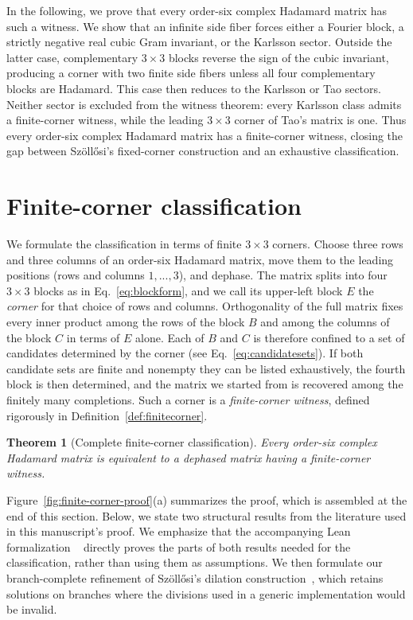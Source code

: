 \documentclass[aps,prx,reprint,nofootinbib,twoside,superscriptaddress,longbibliography,floatfix]{revtex4-2}
\newtheorem{theorem}{Theorem}
\theoremstyle{definition}
\begin{document}
In the following, we prove that every order-six complex Hadamard matrix has such a witness. We show that an infinite side fiber forces either a Fourier block, a strictly negative real cubic Gram invariant, or the Karlsson sector. Outside the latter case, complementary $3\times3$ blocks reverse the sign of the cubic invariant, producing a corner with two finite side fibers unless all four complementary blocks are Hadamard. This case then reduces to the Karlsson or Tao sectors. Neither sector is excluded from the witness theorem: every Karlsson class admits a finite-corner witness, while the leading $3\times3$ corner of Tao's matrix is one. Thus every order-six complex Hadamard matrix has a finite-corner witness, closing the gap between Sz\"oll\H{o}si's fixed-corner construction and an exhaustive classification.

\section{Finite-corner classification}
\label{sec:mainclassification}

We formulate the classification in terms of finite $3\times3$ corners.
Choose three rows and three columns of an order-six Hadamard matrix, move them to the leading positions (rows and columns $1,...,3$), and dephase. The matrix splits into four $3\times3$ blocks as in Eq.~\eqref{eq:blockform}, and we call its upper-left block $E$ the \emph{corner} for that choice of rows and columns. Orthogonality of the full matrix fixes every inner product among the rows of the block $B$ and among the columns of the block $C$ in terms of $E$ alone. Each of $B$ and $C$ is therefore confined to a set of candidates determined by the corner (see Eq.~\eqref{eq:candidatesets}).
If both candidate sets are finite and nonempty they can be listed exhaustively, the fourth block is then determined, and the matrix we started from is recovered among the finitely many completions. Such a corner is a \emph{finite-corner witness}, defined rigorously in Definition~\ref{def:finitecorner}.

\begin{theorem}[Complete finite-corner classification]
\label{thm:classification}
Every order-six complex Hadamard matrix is equivalent to a dephased matrix
having a finite-corner witness.
\end{theorem}

Figure~\ref{fig:finite-corner-proof}(a) summarizes the proof, which is assembled at the end of this section. Below, we state two structural results from the literature used in this manuscript's proof. We emphasize that the accompanying Lean formalization ~\cite{CardenesWuttig2026HadamardRepository} directly proves the parts of both results needed for the classification, rather than using them as assumptions. We then formulate our branch-complete refinement of Sz\"oll\H{o}si's dilation construction~\cite{Szollosi2012FourParameter}, which retains solutions on branches where the divisions used in a generic implementation would be invalid.
\end{document}

